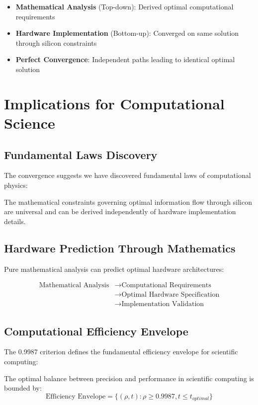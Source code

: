 \documentclass[11pt,a4paper]{article}
\begin{document}
\begin{itemize}
\item \textbf{Mathematical Analysis} (Top-down): Derived optimal computational requirements
\item \textbf{Hardware Implementation} (Bottom-up): Converged on same solution through silicon constraints
\item \textbf{Perfect Convergence}: Independent paths leading to identical optimal solution
\end{itemize}

\section{Implications for Computational Science}

\subsection{Fundamental Laws Discovery}
The convergence suggests we have discovered fundamental laws of computational physics:

\begin{theorem}
The mathematical constraints governing optimal information flow through silicon are universal and can be derived independently of hardware implementation details.
\end{theorem}

\subsection{Hardware Prediction Through Mathematics}
Pure mathematical analysis can predict optimal hardware architectures:

\begin{align}
\text{Mathematical Analysis} &\rightarrow \text{Computational Requirements} \\
&\rightarrow \text{Optimal Hardware Specification} \\
&\rightarrow \text{Implementation Validation}
\end{align}

\subsection{Computational Efficiency Envelope}
The 0.9987 criterion defines the fundamental efficiency envelope for scientific computing:

\begin{theorem}
The optimal balance between precision and performance in scientific computing is bounded by:
\[
\text{Efficiency Envelope} = \{(\rho, t) : \rho \geq 0.9987, t \leq t_{optimal}\}
\]
\end{theorem}
\end{document}
